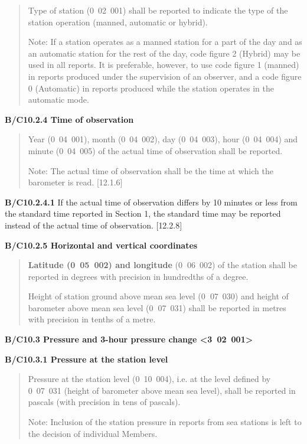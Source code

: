 \begin{quote}
Type of station (0~02~001) shall be reported to indicate the type of the station operation (manned, automatic or hybrid).

Note: If a station operates as a manned station for a part of the day and as an automatic station for the rest of the day, code figure 2 (Hybrid) may be used in all reports. It is preferable, however, to use code figure 1 (manned) in reports produced under the supervision of an observer, and a code figure 0 (Automatic) in reports produced while the station operates in the automatic mode.
\end{quote}

\textbf{B/C10.2.4 Time of observation}

\begin{quote}
Year (0~04~001), month (0~04~002), day (0~04~003), hour (0~04~004) and minute (0~04~005) of the actual time of observation shall be reported.

Note: The actual time of observation shall be the time at which the barometer is read. {[}12.1.6{]}
\end{quote}

\textbf{B/C10.2.4.1} If the actual time of observation differs by 10 minutes or less from the standard time reported in Section 1, the standard time may be reported instead of the actual time of observation. {[}12.2.8{]}

\textbf{B/C10.2.5 Horizontal and vertical coordinates}

\begin{quote}
\textbf{Latitude (0~05~002) and longitude} (0\textbf{~}06~002) of the station shall be reported in degrees with precision in hundredths of a degree.

Height of station ground above mean sea level (0\textbf{~}07~030) and height of barometer above mean sea level (0\textbf{~}07~031) shall be reported in metres with precision in tenths of a metre.
\end{quote}

\textbf{B/C10.3 Pressure and 3-hour pressure change \textless3~02~001\textgreater{}}

\textbf{B/C10.3.1 Pressure at the station level}

\begin{quote}
Pressure at the station level (0~10~004), i.e. at the level defined by 0~07~031 (height of barometer above mean sea level), shall be reported in pascals (with precision in tens of pascals).

Note: Inclusion of the station pressure in reports from sea stations is left to the decision of individual Members.
\end{quote}

